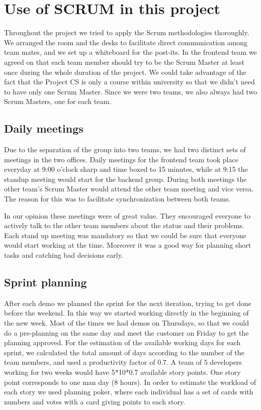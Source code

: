 \section{Use of SCRUM in this project}
Throughout the project we tried to apply the Scrum methodologies thoroughly.
We arranged the room and the desks to facilitate direct communication among team mates,
and we set up a whiteboard for the post-its. 
In the frontend team we agreed on that each team member should try to
be the Scrum Master at least once during the whole duration of the project.
We could take advantage of the fact that the Project CS is only a course within university
so that we didn't need to have only one Scrum Master.
Since we were two teams, we also always had two Scrum Masters, one for each team.

\subsection{Daily meetings}
Due to the separation of the group into two teams, we had two distinct sets of meetings in the two offices.
Daily meetings for the frontend team took place everyday at 9:00 o'clock sharp and time boxed to 15 minutes,
while at 9:15 the standup meeting would start for the backend group.
During both meetings the other team's Scrum Master would attend the other team meeting and vice versa.
The reason for this was to facilitate synchronization between both teams.

In our opinion these meetings were of great value. 
They encouraged everyone to actively talk to the other team members about
the status and their problems.
Each stand up meeting was mandatory so that we could be sure
that everyone would start working at the time. 
Moreover it was a good way for planning short tasks and catching bad decisions early.

\subsection{Sprint planning}
After each demo we planned the sprint for the next iteration, trying to get done before the weekend.
In this way we started working directly in the beginning of the new week. Most of the times we had demos on Thursdays,
so that we could do a pre-planning on the same day and meet the customer on Friday to get the planning approved.
For the estimation of the available working days for each sprint, we calculated the total amount of days
according to the number of the team members, and used a productivity factor of 0.7. A team of 5 developers working
for two weeks would have 5*10*0.7 available story points. One story point corresponds to one man day (8 hours). 
In order to estimate the workload of each story we used planning poker, where each individual has a set of cards
with numbers and votes with a card giving points to each story. 

